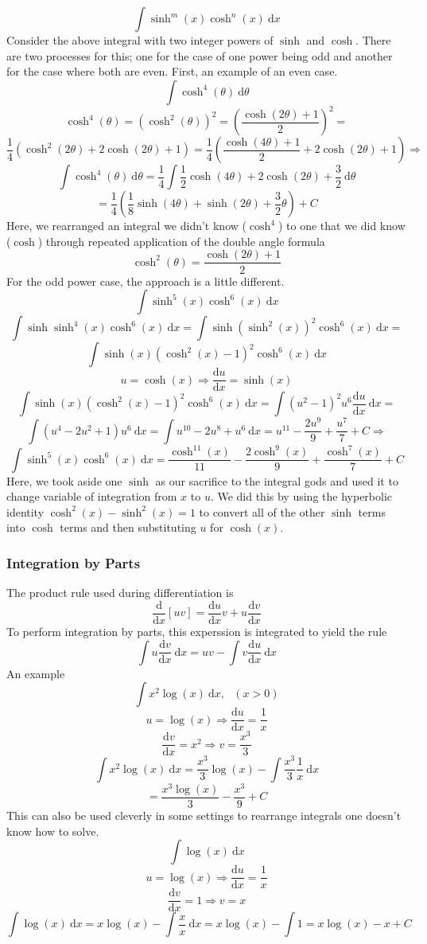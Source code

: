 \documentclass[12pt]{report}
\newcommand{\dx}{\:\mathrm{d}x}
\newcommand{\dd}[2]{\frac{\mathrm{d}#1}{\mathrm{d}#2}}
\newcommand{\mcom}{, \:\:\:}
\newcommand{\derivx}[1]{\frac{\mathrm{d}}{\mathrm{d}x}\left[#1\right]}
\begin{document}
\begin{flushleft}
\[\int \sinh^m(x)\cosh^n(x)\dx\]
Consider the above integral with two integer powers of \(\sinh\) and \(\cosh\).
There are two processes for this; one for the case of one power being odd and
another for the case where both are even. First, an example of an even case.
\[\int \cosh^4(\theta) \:\mathrm{d}\theta\]
\[\cosh^4(\theta) = \left(\cosh^2(\theta)\right)^2 
= \left(\frac{\cosh(2\theta) + 1}{2}\right)^2 = \]
\[\frac{1}{4}\left(\cosh^2(2\theta) + 2\cosh(2\theta) + 1\right) 
= \frac{1}{4}\left(\frac{\cosh(4\theta) + 1}{2} + 2\cosh(2\theta) + 1\right)
\Rightarrow \]
\[\int \cosh^4(\theta) \:\mathrm{d}\theta = \frac{1}{4}\int\frac{1}{2}
\cosh(4\theta) + 2\cosh(2\theta) + \frac{3}{2}  \:\mathrm{d}\theta\]
\[= \frac{1}{4}\left(\frac{1}{8}\sinh(4\theta) + \sinh(2\theta) 
+ \frac{3}{2}\theta\right) + C\]
Here, we rearranged an integral we didn't know (\(\cosh^4\)) to one that we did
know (\(\cosh\)) through repeated application of the double angle formula
\[\cosh^2(\theta) = \frac{\cosh(2\theta) + 1}{2}\]
For the odd power case, the approach is a little different.
\[\int\sinh^5(x)\cosh^6(x)\dx\]
\[\int\sinh\sinh^4(x)\cosh^6(x)\dx = \int\sinh\left(\sinh^2(x)\right)^2
\cosh^6(x)\dx = \]
\[\int\sinh(x)\left(\cosh^2(x) - 1\right)^2\cosh^6(x)\dx\]
\[u = \cosh(x) \Rightarrow \dd{u}{x} = \sinh(x)\]
\[\int\sinh(x)\left(\cosh^2(x) - 1\right)^2\cosh^6(x)\dx 
= \int(u^2 - 1)^2u^6\dd{u}{x} \:\mathrm{d}x = \]
\[\int(u^4 - 2u^2 + 1)u^6 \:\mathrm{d}x = \int u^{10} - 2u^8 + u^6
\:\mathrm{d}x = u^{11} - \frac{2u^9}{9} + \frac{u^7}{7} + C \Rightarrow\]
\[\int\sinh^5(x)\cosh^6(x)\dx = \frac{\cosh^11(x)}{11} 
- \frac{2\cosh^9(x)}{9} + \frac{\cosh^7(x)}{7} + C\]
Here, we took aside one \(\sinh\) as our sacrifice to the integral gods and
used it to change variable of integration from \(x\) to \(u\). We did this by
using the hyperbolic identity \(\cosh^2(x) - \sinh^2(x) = 1\) to convert all of
the other \(\sinh\) terms into \(\cosh\) terms and then substituting \(u\) for
\(\cosh(x)\).

\subsubsection*{Integration by Parts}

The product rule used during differentiation is
\[\derivx{uv} = \dd{u}{x}v + u\dd{v}{x}\]
To perform integration by parts, this experssion is integrated to yield the
rule
\[\int u\dd{v}{x} \dx = uv - \int v\dd{u}{x} \dx\]
An example
\[\int x^2\log(x)\dx\mcom (x > 0)\]
\[u = \log(x) \Rightarrow \dd{u}{x} = \frac{1}{x}\]
\[\dd{v}{x} = x^2 \Rightarrow v = \frac{x^3}{3}\]
\[\int x^2\log(x) \dx = \frac{x^3}{3}\log(x) -\int\frac{x^3}{3}\frac{1}{x}\dx\]
\[= \frac{x^3\log(x)}{3} - \frac{x^3}{9} + C\]
This can also be used cleverly in some settings to rearrange integrals one
doesn't know how to solve.
\[\int\log(x)\dx\]
\[u = \log(x) \Rightarrow \dd{u}{x} = \frac{1}{x}\]
\[\dd{v}{x} = 1 \Rightarrow v = x\]
\[\int\log(x)\dx = x\log(x) - \int \frac{x}{x} \dx = x\log(x) - \int 1 
= x\log(x) - x + C\]


\end{flushleft}
\end{document}
